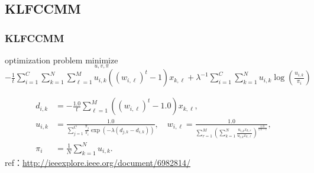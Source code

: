 \documentclass[fleqn,dvipdfmx,10pt]{beamer}
\begin{document}
\subsection{KLFCCMM}
\begin{frame}\frametitle{KLFCCMM}
  \begin{block}{optimization problem}
    $\underset{u,v,\pi}{\text{minimize}}$
    $-\frac{1}{t}\sum_{i=1}^C\sum_{k=1}^N\sum_{\ell=1}^Mu_{i,k}((w_{i,\ell})^t-1)x_{k,\ell}+\lambda^{-1}\sum_{i=1}^C\sum_{k=1}^N u_{i,k}\log{(\frac{u_{i,k}}{\pi_i})}$\centering\\
  \end{block}
  \begin{align*}
    d_{i,k}&=-\frac{1.0}{t}\sum_{\ell=1}^M\left((w_{i,\ell})^{t}-1.0\right)x_{k,\ell},\\
    u_{i,k}&=\frac{1.0}{\sum_{j=1}^C\frac{\pi_{j}}{\pi_{i}}\exp\left(-\lambda(d_{j,k}-d_{i,k})\right)},\quad
    w_{i,\ell}=\frac{1.0}{\sum_{r=1}^M\left(\sum_{k=1}^N\frac{u_{i,k} x_{k,r}}{u_{i,k}x_{k,\ell}}\right)^{\frac{1.0}{1.0-t}}},\\
    \pi_{i}&=\frac{1}{N}\sum_{k=1}^N u_{i,k}.
  \end{align*}
  ref：\url{http://ieeexplore.ieee.org/document/6982814/}\centering
\end{frame}
\end{document}

